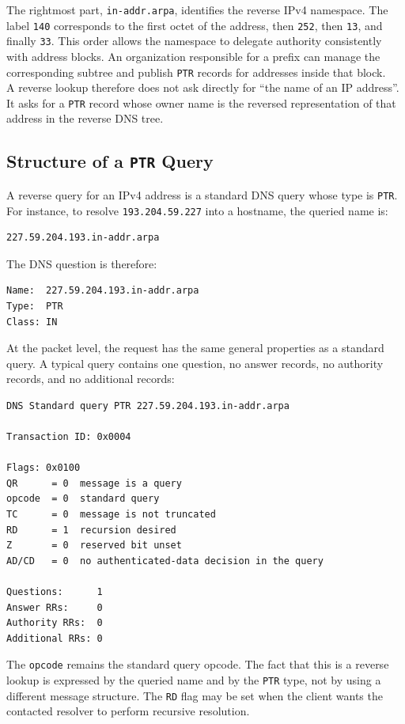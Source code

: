 \documentclass{scrbook}
\begin{document}
	The rightmost part, \texttt{in-addr.arpa}, identifies the reverse IPv4 namespace. The label \texttt{140} corresponds to the first octet of the address, then \texttt{252}, then \texttt{13}, and finally \texttt{33}. This order allows the namespace to delegate authority consistently with address blocks. An organization responsible for a prefix can manage the corresponding subtree and publish \texttt{PTR} records for addresses inside that block.\\
	
	A reverse lookup therefore does not ask directly for ``the name of an IP address''. It asks for a \texttt{PTR} record whose owner name is the reversed representation of that address in the reverse DNS tree.
	
	\subsection{Structure of a \texttt{PTR} Query}
	
	A reverse query for an IPv4 address is a standard DNS query whose type is \texttt{PTR}. For instance, to resolve \texttt{193.204.59.227} into a hostname, the queried name is:
	\begin{lstlisting}
227.59.204.193.in-addr.arpa
	\end{lstlisting}
	
	The DNS question is therefore:
	\begin{lstlisting}
Name:  227.59.204.193.in-addr.arpa
Type:  PTR
Class: IN
	\end{lstlisting}
	
	At the packet level, the request has the same general properties as a standard query. A typical query contains one question, no answer records, no authority records, and no additional records:
	\begin{lstlisting}
DNS Standard query PTR 227.59.204.193.in-addr.arpa

Transaction ID: 0x0004

Flags: 0x0100
QR      = 0  message is a query
opcode  = 0  standard query
TC      = 0  message is not truncated
RD      = 1  recursion desired
Z       = 0  reserved bit unset
AD/CD   = 0  no authenticated-data decision in the query

Questions:      1
Answer RRs:     0
Authority RRs:  0
Additional RRs: 0
	\end{lstlisting}
	
	The \texttt{opcode} remains the standard query opcode. The fact that this is a reverse lookup is expressed by the queried name and by the \texttt{PTR} type, not by using a different message structure. The \texttt{RD} flag may be set when the client wants the contacted resolver to perform recursive resolution.
	
\end{document}

